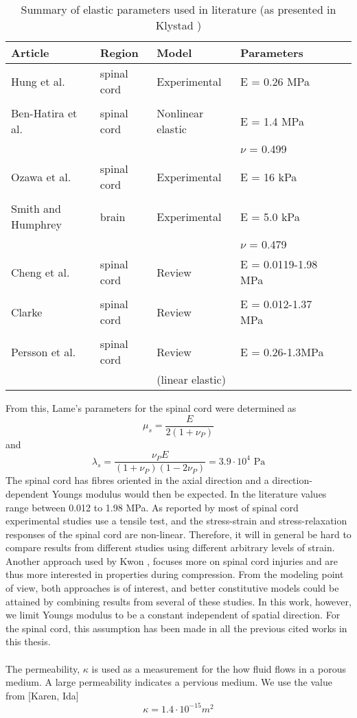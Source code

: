 \begin{table}[!ht]
  \begin{center}
  \begin{tabular}{l  l  l  l  l  l}
	\hline
    Article & Region &  Model & Parameters \\ \hline
	Hung et al. \cite{Hung81} & spinal cord & Experimental & E = 0.26 MPa  \\ \\
	Ben-Hatira et al. \cite{Ben12} & spinal cord & Nonlinear elastic & E  = 1.4 MPa \\
	& & &  $\nu $  = 0.499 \\
	Ozawa et al. \cite{Ozaw04} & spinal cord & Experimental & E = 16 kPa \\ \\
	Smith and Humphrey \cite{Smit07} & brain & Experimental & E = 5.0 kPa \\
	& & &  $\nu$ = 0.479 \\
	Cheng et al. \cite{Chen08} & spinal cord & Review & E = 0.0119-1.98 MPa \\ \\
	Clarke \cite{Clar10} & spinal cord & Review & E = 0.012-1.37 MPa \\ \\
	Persson et al. \cite{Pers10} & spinal cord & Review  & E = 0.26-1.3MPa \\
	& & (linear elastic) & \\ 
    \hline 
  \end{tabular}
  \caption{Summary of elastic parameters used in literature (as presented in Klystad \cite{Kyls14})}
  \end{center}
\end{table}
From this, Lame's parameters for the spinal cord were determined as
\[ \mu_s = \frac{E}{2(1 + \nu_P)} \] and
\[ \lambda_s = \frac{\nu_P E}{(1 + \nu_P)(1-2\nu_P)} = 3.9 \cdot 10^4 \text{ Pa} \]
The spinal cord has fibres oriented in the axial direction and a direction-dependent Youngs modulus would then be expected. In the literature values range between 0.012 to 1.98 MPa. As reported by \cite{Clar10} most of spinal cord experimental studies use a tensile test, and the stress-strain and stress-relaxation responses of the spinal cord are non-linear. Therefore, it will in general be hard to compare results from different studies using different arbitrary levels of strain. Another approach used by Kwon \cite{Kwon02}, focuses more on spinal cord injuries and are thus more interested in properties during compression. From the modeling point of view, both approaches is of interest, and better constitutive models could be attained by combining results from several of these studies. In this work, however, we limit Youngs modulus to be a constant independent of spatial direction. For the spinal cord, this assumption has been made in all the previous cited works in this thesis. 
\\
\\
The permeability, $\kappa$ is used as a measurement for the how fluid flows in a porous medium. A large permeability indicates a pervious medium. We use the value from [Karen, Ida]
\[ \kappa = 1.4\cdot 10^{-15} m^2 \]
